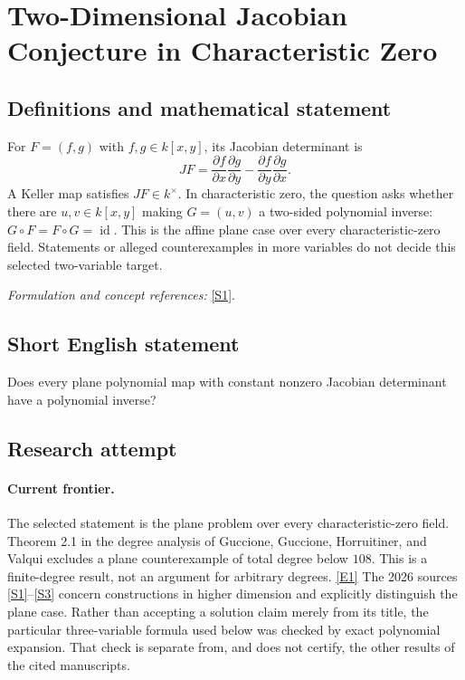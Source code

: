 \documentclass[11pt]{article}
\newcommand{\sref}[2]{\hyperlink{source:#1:#2}{[S#2]}}
\newcommand{\eref}[2]{\hyperlink{extra:#1:#2}{[E#2]}}
\newif\ifshowcatalogue
\newcommand{\cataloguescope}[1]{\ifshowcatalogue
 \paragraph{Exact scope in the supplied catalogue.}
 \begin{quote}\small #1\end{quote}\fi}
\begin{document}
\setcounter{section}{0}
\clearpage
\section*{\texorpdfstring{Two-Dimensional Jacobian Conjecture in Characteristic Zero}{Two-Dimensional Jacobian Conjecture in Characteristic Zero}}\label{30006729}
\subsection{Definitions and mathematical statement}
For $F=(f,g)$ with $f,g\in k[x,y]$, its Jacobian determinant is
\[
 JF=\frac{\partial f}{\partial x}\frac{\partial g}{\partial y}
       -\frac{\partial f}{\partial y}\frac{\partial g}{\partial x}.
\]
A Keller map satisfies $JF\in k^\times$. In characteristic zero, the question asks whether there are $u,v\in k[x,y]$ making $G=(u,v)$ a two-sided polynomial inverse: $G\circ F=F\circ G=\operatorname{id}$. This is the affine plane case over every characteristic-zero field. Statements or alleged counterexamples in more variables do not decide this selected two-variable target.
\par\smallskip\textit{Formulation and concept references:} \sref{30006729}{1}.
\cataloguescope{Let k be a field of characteristic zero and let F:k\textasciicircum{}2 -> k\textasciicircum{}2 be a polynomial map whose Jacobian determinant is a nonzero constant. Determine whether F must have a polynomial inverse, equivalently whether every two-variable Keller map is a polynomial automorphism of the affine plane.}
\subsection{Short English statement}
Does every plane polynomial map with constant nonzero Jacobian determinant have a polynomial inverse?
\subsection{Research attempt}

\paragraph{Current frontier.}
The selected statement is the plane problem over every characteristic-zero
field. Theorem 2.1 in the degree analysis of Guccione, Guccione, Horruitiner,
and Valqui excludes a plane counterexample of total degree below $108$.
This is a finite-degree result, not an argument for arbitrary degrees.
\eref{30006729}{1}
The 2026 sources \sref{30006729}{1}--\sref{30006729}{3} concern constructions in
higher dimension and explicitly distinguish the plane case. Rather than
accepting a solution claim merely from its title, the particular
three-variable formula used below was checked by exact polynomial expansion.
That check is separate from, and does not certify, the other results of the
cited manuscripts.
\end{document}

